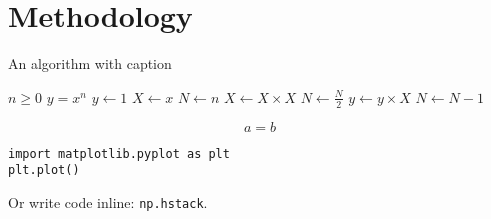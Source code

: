 \chapter{Methodology}
\label{chap:methodology}



\begin{algorithm}
    \caption{An algorithm with caption}\label{alg:cap}
    \begin{algorithmic}
        \Require $n \geq 0$
        \Ensure $y = x^n$
        \State $y \gets 1$
        \State $X \gets x$
        \State $N \gets n$
        \State $X \gets X \times X$
        \State $N \gets \frac{N}{2}$  
        \State $y \gets y \times X$
        \State $N \gets N - 1$
        \EndIf


        \EndWhile
    \end{algorithmic}
\end{algorithm}

\begin{equation}\label{eq:Eq1}
    a=b
\end{equation}


\begin{verbatim}
import matplotlib.pyplot as plt
plt.plot()
\end{verbatim}
Or write code inline: \texttt{np.hstack}.